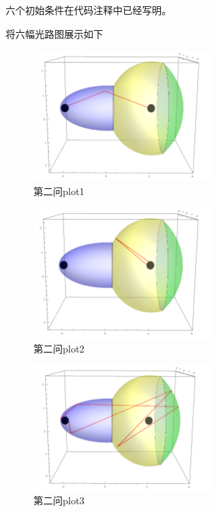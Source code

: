 \documentclass[10pt, a4paper]{article}
\begin{document}
    六个初始条件在代码注释中已经写明。

    将六幅光路图展示如下

    \begin{figure}[H]
        \centering
        \includegraphics[width=0.6\textwidth]{q2_plot1.png}
        \caption{第二问plot1}\label{fig:第二问plot1}
    \end{figure}

    \begin{figure}[H]
        \centering
        \includegraphics[width=0.6\textwidth]{q2_plot2.png}
        \caption{第二问plot2}\label{fig:第二问plot2}
    \end{figure}

    \begin{figure}[H]
        \centering
        \includegraphics[width=0.6\textwidth]{q2_plot3.png}
        \caption{第二问plot3}\label{fig:第二问plot3}
    \end{figure}
\end{document}
